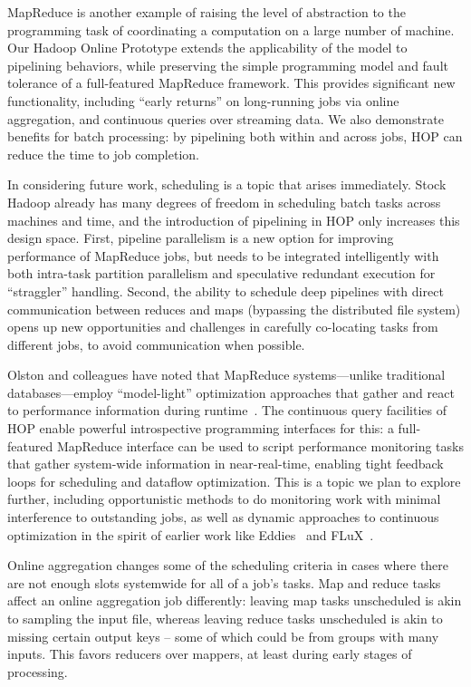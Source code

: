 MapReduce is another example of raising the level of abstraction to the programming
task of coordinating a computation on a large number of machine. 
Our Hadoop Online Prototype extends the applicability of the model to pipelining 
behaviors, while preserving the simple programming model and fault tolerance of a 
full-featured MapReduce framework.  This provides significant new functionality, 
including ``early returns'' on long-running jobs via online aggregation, and continuous 
queries over streaming data.  We also demonstrate benefits for batch processing:  by 
pipelining both within and across jobs, HOP can reduce the time to job completion. 

In considering future work, scheduling is a topic that arises immediately. Stock Hadoop 
already has many degrees of freedom in scheduling batch tasks across machines and time, 
and the introduction of pipelining in HOP only increases this design space.  First, pipeline 
parallelism is a new option for improving performance of MapReduce jobs, but needs to be 
integrated intelligently with both intra-task partition parallelism and speculative redundant 
execution for ``straggler'' handling. Second, the ability to schedule deep pipelines with direct
communication between reduces and maps (bypassing the distributed file system) opens up new 
opportunities and challenges in carefully co-locating tasks from different jobs, to avoid 
communication when possible.  

Olston and colleagues have noted that MapReduce systems---unlike traditional databases---employ ``model-light'' 
optimization approaches that gather and react to performance information during 
runtime~\cite{olston-usenix08}.  The continuous query facilities of HOP enable powerful 
introspective programming interfaces for this: a full-featured MapReduce interface can 
be used to script performance monitoring tasks that gather system-wide information in 
near-real-time, enabling tight feedback loops for scheduling and dataflow optimization. This 
is a topic we plan to explore further, including opportunistic methods to do monitoring work 
with minimal interference to outstanding jobs, as well as dynamic approaches to continuous 
optimization in the spirit of earlier work like Eddies~\cite{eddies} and FLuX~\cite{flux-lb}.

Online aggregation changes some of the scheduling criteria in cases where there are not enough 
slots systemwide for all of a job's tasks.  Map and reduce tasks affect an online aggregation 
job differently: leaving map tasks unscheduled is akin to sampling the input file, whereas leaving 
reduce tasks unscheduled is akin to missing certain output keys -- some of which could be from 
groups with many inputs.  This favors reducers over mappers, at least during early stages of processing.  

